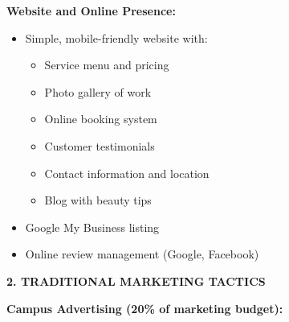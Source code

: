 \documentclass[a4paper,12pt]{article}
\begin{document}
\textbf{Website and Online Presence:}
\begin{itemize}[leftmargin=2em]
    \item Simple, mobile-friendly website with:
    \begin{itemize}
        \item Service menu and pricing
        \item Photo gallery of work
        \item Online booking system
        \item Customer testimonials
        \item Contact information and location
        \item Blog with beauty tips
    \end{itemize}
    \item Google My Business listing
    \item Online review management (Google, Facebook)
\end{itemize}

\vspace{1em}

\textbf{2. TRADITIONAL MARKETING TACTICS}

\textbf{Campus Advertising (20\% of marketing budget):}
\end{document}
